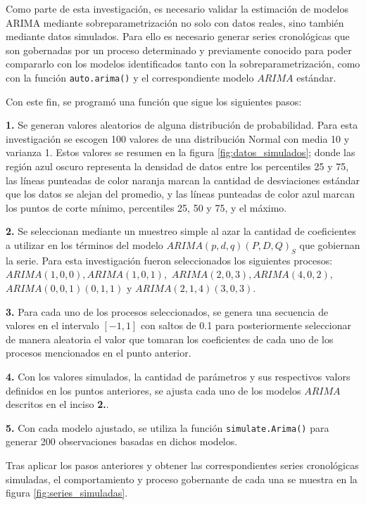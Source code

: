 \documentclass[
]{article}
\begin{document}
Como parte de esta investigación, es necesario validar la estimación de
modelos ARIMA mediante sobreparametrización no solo con datos reales,
sino también mediante datos simulados. Para ello es necesario generar
series cronológicas que son gobernadas por un proceso determinado y
previamente conocido para poder compararlo con los modelos identificados
tanto con la sobreparametrización, como con la función
\texttt{auto.arima()} y el correspondiente modelo \(ARIMA\) estándar.

Con este fin, se programó una función que sigue los siguientes pasos:

\textbf{1.} Se generan valores aleatorios de alguna distribución de
probabilidad. Para esta investigación se escogen 100 valores de una
distribución Normal con media 10 y varianza 1. Estos valores se resumen
en la figura \ref{fig:datos_simulados}; donde las región azul oscuro
representa la densidad de datos entre los percentiles 25 y 75, las
líneas punteadas de color naranja marcan la cantidad de desviaciones
estándar que los datos se alejan del promedio, y las líneas punteadas de
color azul marcan los puntos de corte mínimo, percentiles 25, 50 y 75, y
el máximo.

\textbf{2.} Se seleccionan mediante un muestreo simple al azar la
cantidad de coeficientes a utilizar en los términos del modelo
\(ARIMA(p,d,q)(P,D,Q)_S\) que gobiernan la serie. Para esta
investigación fueron seleccionados los siguientes procesos:
\(ARIMA(1,0,0), ARIMA(1,0,1),\) \(ARIMA(2,0,3), ARIMA(4,0,2),\)
\(ARIMA(0,0,1)(0,1,1)\) y \(ARIMA(2,1,4)(3,0,3)\).

\textbf{3.} Para cada uno de los procesos seleccionados, se genera una
secuencia de valores en el intervalo \([-1,1]\) con saltos de 0.1 para
posteriormente seleccionar de manera aleatoria el valor que tomaran los
coeficientes de cada uno de los procesos mencionados en el punto
anterior.

\textbf{4.} Con los valores simulados, la cantidad de parámetros y sus
respectivos valors definidos en los puntos anteriores, se ajusta cada
uno de los modelos \(ARIMA\) descritos en el inciso \textbf{2.}.

\textbf{5.} Con cada modelo ajustado, se utiliza la función
\texttt{simulate.Arima()} para generar 200 observaciones basadas en
dichos modelos.

Tras aplicar los pasos anteriores y obtener las correspondientes series
cronológicas simuladas, el comportamiento y proceso gobernante de cada
una se muestra en la figura \ref{fig:series_simuladas}.
\end{document}
